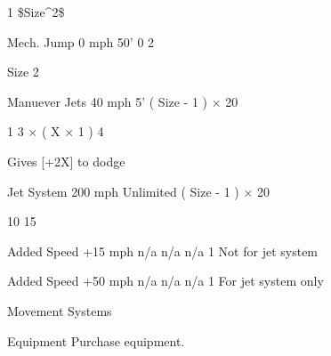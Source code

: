 \documentclass[twoside]{book}
\begin{document}
                       1   
                       \$Size^2\$   
                      
                      
                       Mech. Jump   
                       0 mph   
                       50'   
                       0   
                       2   
                      
                           Size  2 
                          
                        
                      
                      
                       Manuever Jets   
                       40 mph   
                       5'   
                             (    Size  
                          -    1    )   
                         ×    20   
                        
                       1   
                               3 
                         ×    (    X  
                          ×    1    )
                              4  
                         
                        
                       Gives [+2X] to dodge   
                      
                      
                       Jet System   
                       200 mph   
                       Unlimited   
                             (    Size  
                          -    1    )   
                         ×    20   
                        
                       10   
                       15   
                      
                      
                       Added Speed   
                       +15 mph   
                       n/a   
                       n/a   
                       n/a   
                       1   
                       Not for jet system   
                      
                      
                       Added Speed   
                       +50 mph   
                       n/a   
                       n/a   
                       n/a   
                       1   
                       For jet system only   
                      
                    
                  Movement Systems  
                  
                
                
                Equipment  
                  Purchase equipment.   
                
\end{document}
